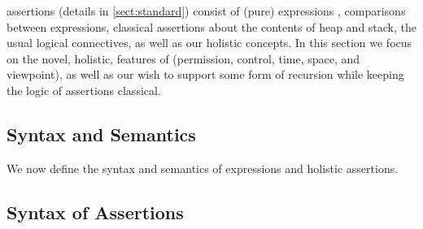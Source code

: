 
\Chainmail assertions (details in  \ref{sect:standard}) consist of (pure) expressions \e, comparisons between expressions, classical
assertions about the contents of  heap and stack, the usual logical
connectives, as well as our holistic concepts.
In this section we focus on the novel,
 holistic, features of \Chainmail (permission, control, time, space, and viewpoint),
as well as our wish to support some form of recursion while keeping the logic of assertions classical.

\subsection{Syntax and Semantics}
 
We now define the syntax and semantics of expressions and holistic assertions.

 \subsection{Syntax of Assertions}

